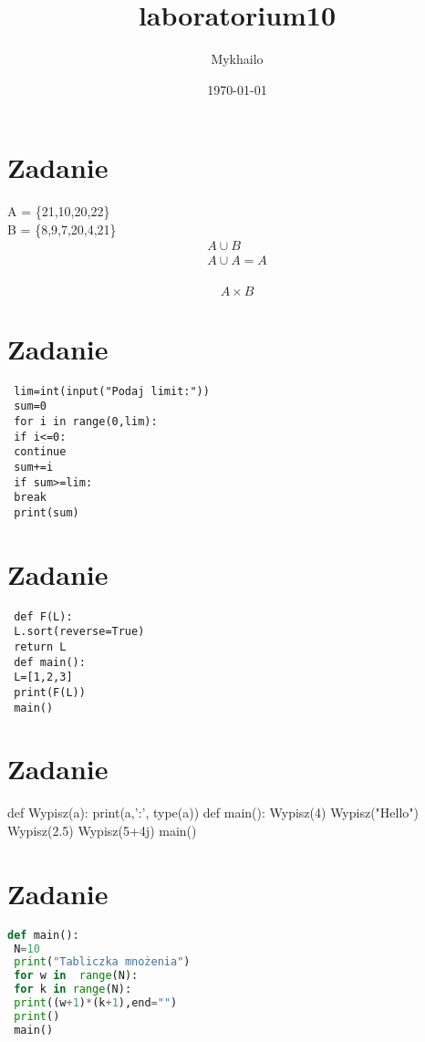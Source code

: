 \documentclass[a4paper,11pt]{article}
\title{laboratorium10}
\author{Mykhailo}
\date{\today}
\begin{document}
\section{Zadanie}
A = \{21,10,20,22\}\\
B = \{8,9,7,20,4,21\}\\

\begin{equation*}
    \begin{array}{l}
        A \cup B \\
        A \cup A = A \\
    \end{array}
 \end{equation*}

 \begin{equation}
    A \times B     
 \end{equation}

\section{Zadanie}
\begin{verbatim}
 lim=int(input("Podaj limit:"))
 sum=0
 for i in range(0,lim):
 if i<=0:
 continue
 sum+=i
 if sum>=lim:
 break
 print(sum)
\end{verbatim}
\section{Zadanie}
\begin{verbatim}
 def F(L):
 L.sort(reverse=True)
 return L
 def main():
 L=[1,2,3]
 print(F(L))
 main()
\end{verbatim}
\section{Zadanie}
\begin{Verbatim*}[frame=single]
 def Wypisz(a):
 print(a,':', type(a))
 def main():
 Wypisz(4)
 Wypisz("Hello")
 Wypisz(2.5)
 Wypisz(5+4j)
 main()
\end{Verbatim*}
\section{Zadanie}

\begin{lstlisting}[language=Python]
def main():
 N=10
 print("Tabliczka mnożenia")
 for w in  range(N):
 for k in range(N):
 print((w+1)*(k+1),end="")
 print()
 main()
\end{lstlisting}
\end{document}
